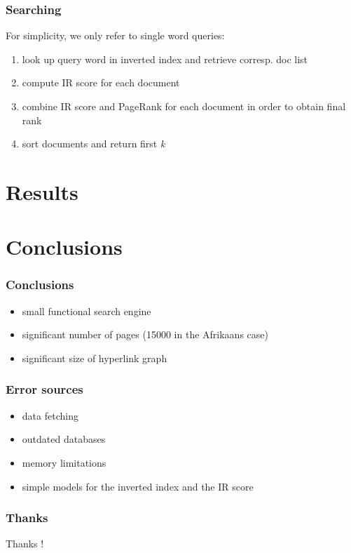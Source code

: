 \documentclass[9pt]{beamer}
\begin{document}
\begin{frame}
\frametitle{Searching}

For simplicity, we only refer to single word queries:
\begin{enumerate}
\item look up query word in inverted index and retrieve corresp. doc list
\item compute IR score for each document
\item combine IR score and PageRank for each document in order to obtain final rank
\item sort documents and return first \emph{k}
\end{enumerate}
\end{frame}






\section{Results}



\section{Conclusions}
\begin{frame}
\frametitle{Conclusions}

\begin{itemize}
\item small functional search engine
\item significant number of pages (15000 in the Afrikaans case)
\item significant size of hyperlink graph
\end{itemize}
\end{frame}

\begin{frame}
\frametitle{Error sources}
\begin{itemize}
\item data fetching
\item outdated databases
\item memory limitations
\item simple models for the inverted index and the IR score
\end{itemize}
\end{frame}

\begin{frame}
  \frametitle{Thanks}
  \begin{center}
    Thanks !
  \end{center}
\end{frame}
\end{document}
